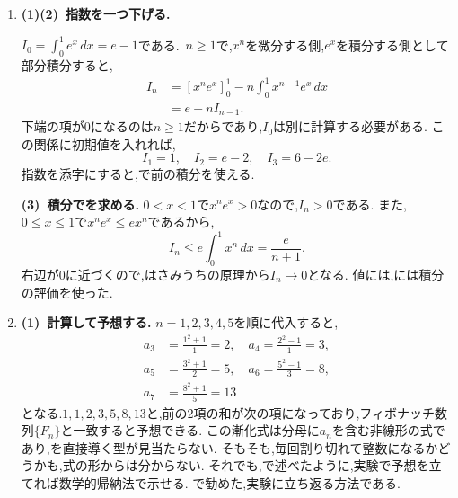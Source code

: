 \begin{enumerate}[label=\textbf{問\arabic*.},leftmargin=3.8em,format=\bookitemlink{practice-bridge}{solution}{problem}]
    \smallskip
    \textbf{(3)~無限個の整数解を作る.}
    初期値と係数から$x_n,y_n$は整数であり,$n\ge1$では両方が正となる.
    さらに,
    \[
      x_{n+1}-x_n=x_n+3y_n>0
    \]
    なので,同じ解は繰り返されない.
    (1)のからすべて$x^2-3y^2=1$を満たすため,正の整数解が無限個得られる.
    に無理数が現れても,は整数性と異なる解の生成を保証する.
  \item \textbf{(1)(2)~指数を一つ下げる.}\par\nobreak
    $I_0=\int_0^1e^x\,dx=e-1$である.\,
    $n\ge1$で,$x^n$を微分する側,$e^x$を積分する側として部分積分すると,
    \begin{align*}
      I_n&=[x^ne^x]_0^1
      -n\int_0^1x^{n-1}e^x\,dx\\
      &=e-nI_{n-1}.
    \end{align*}
    下端の項が$0$になるのは$n\ge1$だからであり,$I_0$は別に計算する必要がある.
    この関係に初期値を入れれば,
    \[
      I_1=1,\quad I_2=e-2,\quad I_3=6-2e.
    \]
    指数を添字にすると,で前の積分を使える.

    \smallskip
    \textbf{(3)~積分でを求める.}
    $0<x<1$で$x^ne^x>0$なので,$I_n>0$である.
    また,$0\le x\le1$で$x^ne^x\le ex^n$であるから,
    \[
      I_n\le e\int_0^1x^n\,dx=\frac{e}{n+1}.
    \]
    右辺が$0$に近づくので,はさみうちの原理から$I_n\to0$となる.
    値には,には積分の評価を使った.
  \item \textbf{(1)~計算して予想する.}
    $n=1,2,3,4,5$を順に代入すると,
    \begin{align*}
      a_3&=\frac{1^2+1}{1}=2,\quad a_4=\frac{2^2-1}{1}=3,\\
      a_5&=\frac{3^2+1}{2}=5,\quad a_6=\frac{5^2-1}{3}=8,\\
      a_7&=\frac{8^2+1}{5}=13
    \end{align*}
    となる.$1,1,2,3,5,8,13$と,前の2項の和が次の項になっており,フィボナッチ数列$\{F_n\}$と一致すると予想できる.
    この漸化式は分母に$a_n$を含む非線形の式であり,を直接導く型が見当たらない.
    そもそも,毎回割り切れて整数になるかどうかも,式の形からは分からない.
    それでも,で述べたように,実験で予想を立てれば数学的帰納法で示せる.
    で勧めた,実験に立ち返る方法である.


\end{enumerate}
